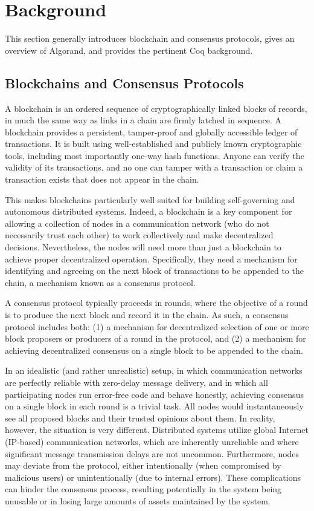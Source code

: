 \section{Background}
\label{sec:background}
This section generally introduces blockchain and consensus protocols, gives an overview of Algorand, and provides the pertinent Coq background.

\subsection{Blockchains and Consensus Protocols}

A blockchain is an ordered sequence of cryptographically linked blocks of records, in much the same way as links in a chain are firmly latched in sequence. A blockchain provides a persistent, tamper-proof and globally accessible ledger of transactions. It is built using well-established and publicly known cryptographic tools, including most importantly one-way hash functions. Anyone can verify the validity of its transactions, and no one can tamper with a transaction or claim a transaction exists that does not appear in the chain.

This makes blockchains particularly well suited for building self-governing and autonomous distributed systems. Indeed, a blockchain is a key component for allowing a collection of nodes in a communication network (who do not necessarily trust each other) to work collectively and make decentralized decisions. Nevertheless, the nodes will need more than just a blockchain to achieve proper decentralized operation. Specifically, they need a mechanism for identifying and agreeing on the next block of transactions to be appended to the chain, a mechanism known as a consensus protocol.

A consensus protocol typically proceeds in rounds, where the objective of a round is to produce the next block and record it in the chain. As such, a consensus protocol includes both:
(1) a mechanism for decentralized selection of one or more block proposers or producers of a round in the protocol, and 
(2) a mechanism for achieving decentralized consensus on a single block to be appended to the chain. 

In an idealistic (and rather unrealistic) setup, in which communication networks are perfectly reliable with zero-delay message delivery, and in which all participating nodes run error-free code and behave honestly, achieving consensus on a single block in each round is a trivial task. All nodes would instantaneously see all proposed blocks and their trusted opinions about them. In reality, however, the situation is very different. Distributed systems utilize global Internet (IP-based) communication networks, which are inherently unreliable and where significant message transmission delays are not uncommon. Furthermore, nodes may deviate from the protocol, either intentionally (when compromised by malicious users) or unintentionally (due to internal errors). These complications can hinder the consensus process, resulting potentially in the system being unusable or in losing large amounts of assets maintained by the system.


